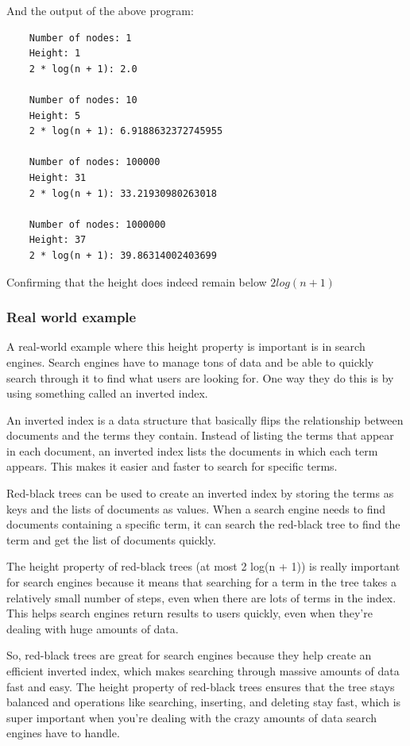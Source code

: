 \documentclass[10pt]{article}
\begin{document}
  And the output of the above program:

  \begin{verbatim}
    Number of nodes: 1
    Height: 1
    2 * log(n + 1): 2.0

    Number of nodes: 10
    Height: 5
    2 * log(n + 1): 6.9188632372745955

    Number of nodes: 100000
    Height: 31
    2 * log(n + 1): 33.21930980263018

    Number of nodes: 1000000
    Height: 37
    2 * log(n + 1): 39.86314002403699
  \end{verbatim}

  Confirming that the height does indeed remain below $2log(n + 1)$

  \subsubsection*{Real world example}


  A real-world example where this height property is important is in search engines.
  Search engines have to manage tons of data and be able to quickly search
  through it to find what users are looking for. One way they do this is by using
  something called an inverted index.

  \spacing
  \noindent
  An inverted index is a data structure that basically flips the relationship between
  documents and the terms they contain. Instead of listing the terms that appear
  in each document, an inverted index lists the documents in which each term appears.
  This makes it easier and faster to search for specific terms.

  \spacing
  \noindent
  Red-black trees can be used to create an inverted index by storing the terms
  as keys and the lists of documents as values. When a search engine needs to find
  documents containing a specific term, it can search the red-black tree to find
  the term and get the list of documents quickly.

  \spacing
  \noindent
  The height property of red-black trees (at most 2 log(n + 1)) is really important
  for search engines because it means that searching for a term in the tree takes
  a relatively small number of steps, even when there are lots of terms in the
  index. This helps search engines return results to users quickly, even when
  they're dealing with huge amounts of data.

  \spacing
  \noindent
  So, red-black trees are great for search engines because they help create an efficient
  inverted index, which makes searching through massive amounts of data fast and
  easy. The height property of red-black trees ensures that the tree stays balanced
  and operations like searching, inserting, and deleting stay fast, which is
  super important when you're dealing with the crazy amounts of data search
  engines have to handle.
\end{document}
